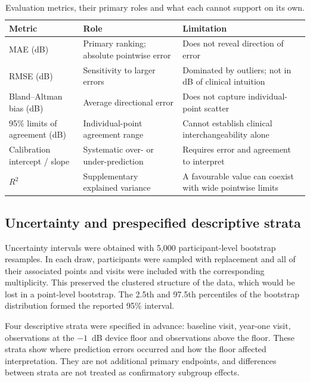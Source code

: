 \begin{table}[htbp]
\centering
\caption{Evaluation metrics, their primary roles and what each cannot support on its own.}
\label{tab:metrics}
\begin{tabularx}{\textwidth}{p{}p{}X}
\toprule
Metric & Role & Limitation \\
\midrule
MAE (dB) & Primary ranking; absolute pointwise error & Does not reveal direction of error \\
RMSE (dB) & Sensitivity to larger errors & Dominated by outliers; not in dB of clinical intuition \\
Bland--Altman bias (dB) & Average directional error & Does not capture individual-point scatter \\
95\% limits of agreement (dB) & Individual-point agreement range & Cannot establish clinical interchangeability alone \\
Calibration intercept / slope & Systematic over- or under-prediction & Requires error and agreement to interpret \\
$R^2$ & Supplementary explained variance & A favourable value can coexist with wide pointwise limits \\
\bottomrule
\end{tabularx}
\end{table}

\subsection{Uncertainty and prespecified descriptive strata}

Uncertainty intervals were obtained with 5,000 participant-level bootstrap resamples. In each draw, participants were sampled with replacement and all of their associated points and visits were included with the corresponding multiplicity. This preserved the clustered structure of the data, which would be lost in a point-level bootstrap. The 2.5th and 97.5th percentiles of the bootstrap distribution formed the reported 95\% interval.

Four descriptive strata were specified in advance: baseline visit, year-one visit, observations at the $-1$~dB device floor and observations above the floor. These strata show where prediction errors occurred and how the floor affected interpretation. They are not additional primary endpoints, and differences between strata are not treated as confirmatory subgroup effects.

